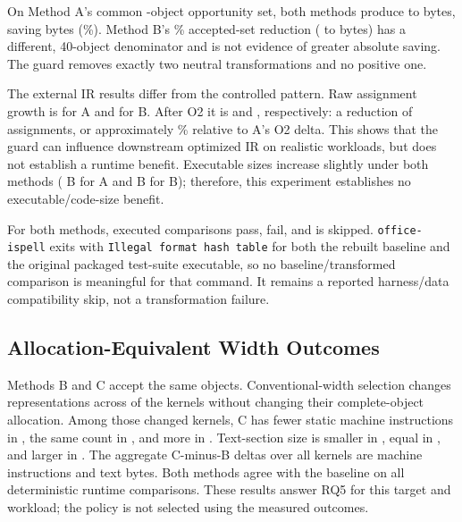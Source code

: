 \documentclass[11pt,twocolumn]{article}
\begin{document}
On Method A's common \ExternalATransformed{}-object opportunity set, both
methods produce \ExternalCommonBaseline{} to \ExternalCommonResult{} bytes,
saving \ExternalCommonSaved{} bytes (\ExternalCommonPercent\%). Method B's
\ExternalAcceptedBPercent\% accepted-set reduction
(\ExternalAcceptedBBaseline{} to \ExternalAcceptedBResult{} bytes) has a
different, 40-object denominator and is not evidence of greater absolute
saving. The guard removes exactly two neutral transformations and no positive
one.



The external IR results differ from the controlled pattern. Raw assignment
growth is \ExternalARawIR{} for A and \ExternalBRawIR{} for B. After O2 it is
\ExternalAOtwoIR{} and \ExternalBOtwoIR{}, respectively: a reduction of
\ExternalOtwoAvoided{} assignments, or approximately
\ExternalOtwoAvoidedPercent\% relative to A's O2 delta. This shows that the
guard can influence downstream optimized IR on realistic workloads, but does
not establish a runtime benefit. Executable sizes increase slightly under both
methods (\ExternalAExecutableDelta{} B for A and
\ExternalBExecutableDelta{} B for B); therefore, this experiment establishes
no executable/code-size benefit.

For both methods, \ExternalDiffPassed{} executed comparisons pass,
\ExternalDiffFailed{} fail, and \ExternalDiffSkipped{} is skipped.
\texttt{office-ispell} exits with \texttt{Illegal format hash table} for both
the rebuilt baseline and the original packaged test-suite executable, so no
baseline/transformed comparison is meaningful for that command. It remains a
reported harness/data compatibility skip, not a transformation failure.

\subsection{Allocation-Equivalent Width Outcomes}



Methods B and C accept the same \WidthObjects{} objects. Conventional-width
selection changes \WidthChangedObjects{} representations across
\WidthChangedKernels{} of the \WidthKernels{} kernels without changing their
complete-object allocation. Among those changed kernels, C has fewer static
machine instructions in \WidthInstructionBetter{}, the same count in
\WidthInstructionEqual{}, and more in \WidthInstructionWorse{}.
Text-section size is smaller in \WidthTextBetter{}, equal in
\WidthTextEqual{}, and larger in \WidthTextWorse{}.
The aggregate C-minus-B deltas over all kernels are
\WidthInstructionDelta{} machine instructions and \WidthTextDelta{} text bytes.
Both methods agree with the baseline on all \WidthRuntimePassed{} deterministic
runtime comparisons. These results answer RQ5 for this target and workload;
the policy is not selected using the measured outcomes.
\end{document}
